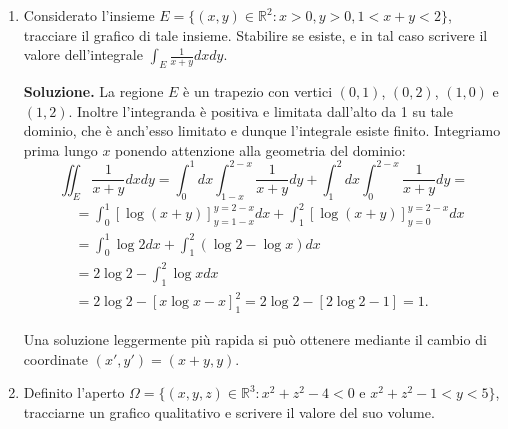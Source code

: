 \begin{enumerate}
		Una soluzione differente potrebbe essere la seguente. Notiamo che se $(x,y,z) \in \Omega$, allora in particolare abbiamo
		\[
		4(x^2 + y^2) < 4.
		\]
		Dal Teorema di Tonelli, integrando su $B(0,1)$ la misura dell'intervallo $[-2 + 2x^2 + 2y^2, 2 - 2x^2 - 2y^2]$ (corrispondente all'intervallo in cui può variare $z$ se $(x,y)$ sono fissi), ne segue che
		\[
		\begin{aligned}
			\mathbf{m}_3(\Omega) &= 4 \int_{B(0,1)} (1 - x^2 - y^2) dx dy \\
			&= 4 \int_{B(0,1)} \rho (1 - \rho^2) d\rho d\theta \\
			&= 4 \int_0^{2\pi} \left[\frac{\rho^2}{2} - \frac{\rho^4}{4}\right]_0^1 d\theta = 2\pi,
		\end{aligned}
		\]
		concludendo l'esercizio. Si noti che si è integrato su $B(0,1)$ perché questo è esattamente il luogo dei punti $(x_0,y_0)$ per cui esiste almeno un $z$ tale che $(x_0,y_0,z) \in \Omega$.

	
	\item Considerato l'insieme $E = \{(x,y) \in \mathbb{R}^2 : x > 0, y > 0, 1 < x + y < 2\}$, tracciare il grafico di tale insieme. Stabilire se esiste, e in tal caso scrivere il valore dell'integrale $\int_E \frac{1}{x + y} dx dy$.
	
	\textbf{Soluzione.}
		La regione $E$ è un trapezio con vertici $(0,1)$, $(0,2)$, $(1,0)$ e $(1,2)$. Inoltre l'integranda è positiva e limitata dall'alto da 1 su tale dominio, che è anch'esso limitato e dunque l'integrale esiste finito. Integriamo prima lungo $x$ ponendo attenzione alla geometria del dominio:
		\[
		\iint_E \frac{1}{x + y} dx dy = \int_0^1 dx \int_{1 - x}^{2 - x} \frac{1}{x + y} dy + \int_1^2 dx \int_0^{2 - x} \frac{1}{x + y} dy =
		\]
		\[
		\begin{aligned}
			&= \int_0^1 [\log(x + y)]_{y = 1 - x}^{y = 2 - x} dx + \int_1^2 [\log(x + y)]_{y = 0}^{y = 2 - x} dx \\
			&= \int_0^1 \log 2 dx + \int_1^2 (\log 2 - \log x) dx \\
			&= 2 \log 2 - \int_1^2 \log x dx \\
			&= 2 \log 2 - [x \log x - x]_1^2 = 2 \log 2 - [2 \log 2 - 1] = 1.
		\end{aligned}
		\]
		
		Una soluzione leggermente più rapida si può ottenere mediante il cambio di coordinate $(x', y') = (x + y, y)$.
	
	
	\item Definito l'aperto $\Omega = \{(x,y,z) \in \mathbb{R}^3 : x^2 + z^2 - 4 < 0 \text{ e } x^2 + z^2 - 1 < y < 5\}$, tracciarne un grafico qualitativo e scrivere il valore del suo volume.
	

\end{enumerate}
